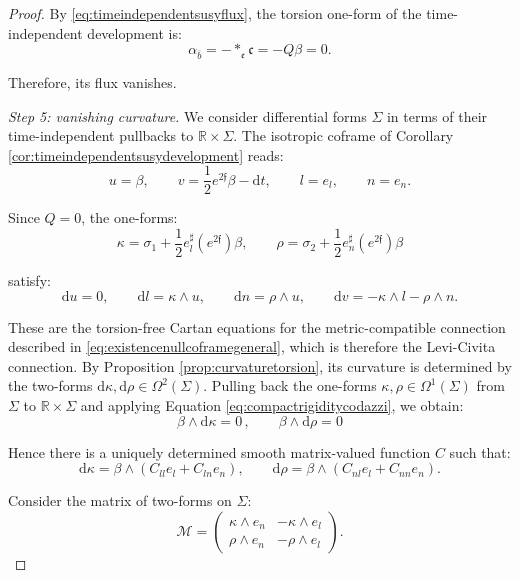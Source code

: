 \documentclass[10pt,reqno,a4paper]{amsart}
\theoremstyle{plain}
\theoremstyle{definition}
\theoremstyle{remark}
\theoremstyle{remark}
\def\dd{\mathrm{d}}
\def\frc{\mathfrak{c}}
\def\fre{\mathfrak{e}}
\renewcommand{\(}{ (}
\renewcommand{\)}{ )}
\newcommand{\frf}{\mathfrak{f}}
\begin{document}
\begin{proof}
\noindent
By \eqref{eq:timeindependentsusyflux}, the torsion one-form of the time-independent development is:
\begin{equation*}
\alpha_{\bar b}=-\ast_{\fre}\frc=-Q\beta=0.
\end{equation*}
	
\noindent
Therefore, its flux vanishes.
	
\medskip
\noindent
\emph{Step 5: vanishing curvature.}
We consider differential forms $\Sigma$ in terms of their time-independent pullbacks to $\mathbb{R} \times \Sigma$. The isotropic coframe of Corollary \ref{cor:timeindependentsusydevelopment} reads:
\begin{equation*}
u=\beta, \qquad v=\frac{1}{2}e^{2\frf}\beta-\dd t, \qquad l=e_l, \qquad n=e_n.
\end{equation*}
	
\noindent
Since $Q=0$, the one-forms:
\begin{equation*}
\kappa = \sigma_1+\frac{1}{2}e_l^{\sharp}(e^{2\frf})\beta, \qquad \rho = \sigma_2 + \frac{1}{2}e_n^{\sharp}(e^{2\frf})\beta
\end{equation*}
	
\noindent
satisfy:
\begin{equation*}
\dd u=0, \qquad \dd l=\kappa\wedge u, \qquad \dd n=\rho\wedge u, \qquad \dd v=-\kappa\wedge l-\rho\wedge n.
\end{equation*}
	
\noindent
These are the torsion-free Cartan equations for the metric-compatible connection described in \eqref{eq:existencenullcoframegeneral}, which is therefore the Levi-Civita connection. By Proposition \ref{prop:curvaturetorsion}, its curvature is determined by the two-forms $\dd\kappa,\dd\rho \in \Omega^2(\Sigma)$. Pulling back the one-forms $\kappa,\rho\in \Omega^1(\Sigma)$ from $\Sigma$ to $\mathbb{R}\times \Sigma$ and applying Equation \eqref{eq:compactrigiditycodazzi}, we obtain:
\begin{equation*}
\beta \wedge \dd\kappa = 0\, , \qquad \beta \wedge \dd\rho=0    
\end{equation*}

\noindent
Hence there is a uniquely determined smooth matrix-valued function $C$ such that:
\begin{equation}
\label{eq:compactrigiditycurvaturematrix}
\dd\kappa = \beta\wedge(C_{ll}e_l+C_{ln}e_n), \qquad \dd\rho = \beta \wedge (C_{nl}e_l+C_{nn}e_n).
\end{equation}
	
\noindent
Consider the matrix of two-forms on $\Sigma$:
\begin{equation*}
\mathcal{M} =
\begin{pmatrix}
\kappa\wedge e_n & -\kappa\wedge e_l\\
\rho\wedge e_n & -\rho\wedge e_l
\end{pmatrix}.
\end{equation*}
	

\end{proof}
\end{document}
